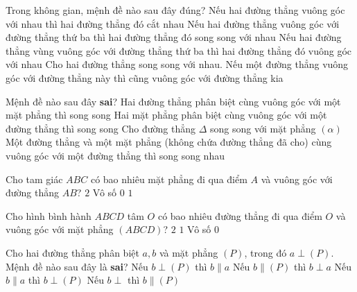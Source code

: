 \begin{ex}%
	Trong không gian, mệnh đề nào sau  đây đúng?
	\choice 
		{Nếu hai đường  thẳng vuông góc với nhau thì hai đường thẳng đó cắt nhau}
		 {Nếu hai đường thẳng vuông góc với đường thẳng thứ ba thì hai đường thẳng đó song song với nhau}
		{Nếu hai đường thẳng vùng vuông góc với đường thẳng thứ  ba thì hai đường thẳng đó vuông góc với nhau}
		{\True Cho  hai đường thẳng song song với nhau. Nếu một đường thẳng vuông góc với đường thẳng này thì cũng vuông góc với đường thẳng kia}
\end{ex}

\begin{ex}%
	 Mệnh đề nào sau đây \textbf{sai}?
	\choice 
		{Hai đường thẳng phân biệt cùng vuông góc với một mặt phẳng thì song  song}
		{Hai mặt phẳng phân  biệt cùng vuông góc với một đường thẳng thì song song}
		{\True Cho đường thẳng $\Delta$ song song với  mặt phẳng $(\alpha)$}
		{Một đường thẳng và một mặt phẳng (không chứa đường  thẳng đã cho) cùng vuông góc với một đường thẳng thì song song nhau}
\end{ex}

\begin{ex}%
	Cho tam giác $A B C$ có bao nhiêu mặt phẳng đi qua điểm $A$ và vuông góc với  đường thẳng $A B$?
	 \choice
		{$2$} 
		 {Vô số}
		 {$0$}
		{\True  $1$}
\end{ex}

\begin{ex}%
	Cho hình bình hành $A B C D$ tâm $O$ có bao nhiêu đường thẳng đi qua điểm $O$ và vuông góc với mặt phẳng $(A B C  D)$?
	 \choice
		 {$2$}
		{\True  $1$}
		 {Vô số}
		{$0$} 
\end{ex}

\begin{ex}%
	Cho hai đường thẳng phân biệt $a, b$ và mặt phẳng $(P)$, trong đó $a\perp(P)$. Mệnh  đề nào sau đây là \textbf{sai}?
	\choice 
		{Nếu $b \perp(P)$ thì  $b \parallel a$}
		{Nếu  $b \parallel (P)$ thì $b \perp a$}
		 {Nếu $b \parallel a$ thì $b\perp(P)$}
		{\True Nếu  $b\perp$ thì $b \parallel(P)$}
\end{ex}

